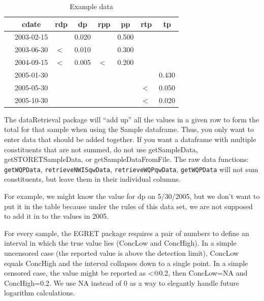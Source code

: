 \documentclass[a4paper,11pt]{article}\usepackage[]{graphicx}\usepackage[]{color}
\begin{document}
\begin{table}[ht]
\caption{Example data} 
\label{tab:exampleComplexQW}
{\footnotesize
\begin{tabular}{rllrlrlr}
  \hline
 & \multicolumn{1}{c}{\textbf{\textsf{cdate}}} & \multicolumn{1}{c}{\textbf{\textsf{rdp}}} & \multicolumn{1}{c}{\textbf{\textsf{dp}}} & \multicolumn{1}{c}{\textbf{\textsf{rpp}}} & \multicolumn{1}{c}{\textbf{\textsf{pp}}} & \multicolumn{1}{c}{\textbf{\textsf{rtp}}} & \multicolumn{1}{c}{\textbf{\textsf{tp}}} \\ 
  \hline
 & 2003-02-15 &  & 0.020 &  & 0.500 &  &  \\ 
  [5pt] & 2003-06-30 & $<$ & 0.010 &  & 0.300 &  &  \\ 
  [5pt] & 2004-09-15 & $<$ & 0.005 & $<$ & 0.200 &  &  \\ 
  [5pt] & 2005-01-30 &  &  &  &  &  & 0.430 \\ 
  [5pt] & 2005-05-30 &  &  &  &  & $<$ & 0.050 \\ 
  [5pt] & 2005-10-30 &  &  &  &  & $<$ & 0.020 \\ 
   \hline
\end{tabular}
}
\end{table}


The dataRetrieval package will \enquote{add up} all the values in a given row to form the total for that sample when using the Sample dataframe. Thus, you only want to enter data that should be added together. If you want a dataframe with multiple constituents that are not summed, do not use getSampleData, getSTORETSampleData, or getSampleDataFromFile. The raw data functions: \texttt{getWQPData}, \texttt{retrieveNWISqwData}, \texttt{retrieveWQPqwData}, \texttt{getWQPData} will not sum constituents, but leave them in their individual columns. 

For example, we might know the value for dp on 5/30/2005, but we don't want to put it in the table because under the rules of this data set, we are not supposed to add it in to the values in 2005.

For every sample, the EGRET package requires a pair of numbers to define an interval in which the true value lies (ConcLow and ConcHigh). In a simple uncensored case (the reported value is above the detection limit), ConcLow equals ConcHigh and the interval collapses down to a single point. In a simple censored case, the value might be reported as \verb@<@0.2, then ConcLow=NA and ConcHigh=0.2. We use NA instead of 0 as a way to elegantly handle future logarithm calculations.
\end{document}
